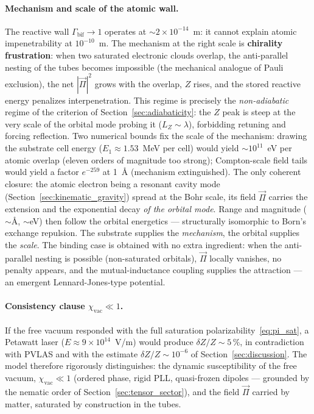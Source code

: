 \documentclass[11pt,a4paper]{article}
\theoremstyle{plain}
\theoremstyle{remark}
\begin{document}
\paragraph{Mechanism and scale of the atomic wall.} The reactive wall $\Gamma_{\text{bif}} \to 1$ operates at $\sim 2\times10^{-14}$~m: it cannot explain atomic impenetrability at $10^{-10}$~m. The mechanism at the right scale is \textbf{chirality frustration}: when two saturated electronic clouds overlap, the anti-parallel nesting of the tubes becomes impossible (the mechanical analogue of Pauli exclusion), the net $|\vec{\Pi}|^2$ grows with the overlap, $Z$ rises, and the stored reactive energy penalizes interpenetration. This regime is precisely the \emph{non-adiabatic} regime of the criterion of Section~\ref{sec:adiabaticity}: the $Z$ peak is steep at the very scale of the orbital mode probing it ($L_Z \sim \lambda$), forbidding retuning and forcing reflection. Two numerical bounds fix the scale of the mechanism: drawing the substrate cell energy ($E_1 \approx 1.53$~MeV per cell) would yield $\sim10^{11}$~eV per atomic overlap (eleven orders of magnitude too strong); Compton-scale field tails would yield a factor $e^{-259}$ at 1~\AA{} (mechanism extinguished). The only coherent closure: the atomic electron being a resonant cavity mode (Section~\ref{sec:kinematic_gravity}) spread at the Bohr scale, its field $\vec{\Pi}$ carries the extension and the exponential decay \emph{of the orbital mode}. Range and magnitude ($\sim$\AA, $\sim$eV) then follow the orbital energetics --- structurally isomorphic to Born's exchange repulsion. The substrate supplies the \emph{mechanism}, the orbital supplies the \emph{scale}. The binding case is obtained with no extra ingredient: when the anti-parallel nesting is possible (non-saturated orbitals), $\vec{\Pi}$ locally vanishes, no penalty appears, and the mutual-inductance coupling supplies the attraction --- an emergent Lennard-Jones-type potential.

\paragraph{Consistency clause $\chi_{\text{vac}} \ll 1$.} If the free vacuum responded with the full saturation polarizability~\eqref{eq:pi_sat}, a Petawatt laser ($E \approx 9\times10^{14}$~V/m) would produce $\delta Z/Z \sim 5\,\%$, in contradiction with PVLAS and with the estimate $\delta Z/Z \sim 10^{-6}$ of Section~\ref{sec:discussion}. The model therefore rigorously distinguishes: the dynamic susceptibility of the free vacuum, $\chi_{\text{vac}} \ll 1$ (ordered phase, rigid PLL, quasi-frozen dipoles --- grounded by the nematic order of Section~\ref{sec:tensor_sector}), and the field $\vec{\Pi}$ carried by matter, saturated by construction in the tubes.
\end{document}
